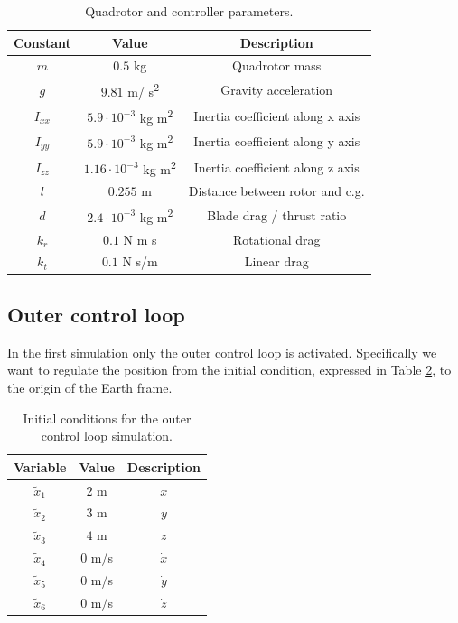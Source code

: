 \documentclass[11pt,a4paper]{scrartcl}
\begin{document}
\begin{table}[H]
	\centering
	\begin{tabular}{c c c}
		\toprule
		Constant & Value & Description \\
		\midrule 
		$m$  & $0.5$ kg & Quadrotor mass \\
		$g$  & $9.81$ m/ s\textsuperscript{2}  & Gravity acceleration \\
		$I_{xx}$  & $5.9\cdot 10^{-3}$ kg m\textsuperscript{2} & Inertia coefficient along x axis \\
		$I_{yy}$  & $5.9\cdot 10^{-3}$ kg m\textsuperscript{2} & Inertia coefficient along y axis \\
		$I_{zz}$  & $1.16\cdot 10^{-3}$ kg m\textsuperscript{2} & Inertia coefficient along z axis \\
		$l$  & $0.255$ m & Distance between rotor and c.g. \\
		$d$  & $2.4\cdot 10^{-3}$ kg m\textsuperscript{2} & Blade drag / thrust ratio \\
		$k_r$  & $0.1$ N m s & Rotational drag \\
		$k_t$  & $0.1$ N s/m & Linear drag \\
		\bottomrule
	\end{tabular}
	\caption{Quadrotor and controller parameters.}
	\label{Quadrotor and parameters}
\end{table}

\subsection*{Outer control loop}

In the first simulation only the outer control loop is activated. Specifically we want to regulate the position from the initial condition, expressed in Table \ref{InitCondOuter}, to the origin of the Earth frame.

\begin{table}[H]
	\centering
	\begin{tabular}{c c c}
		\toprule
		Variable & Value & Description \\
		\midrule 
		$\tilde{x}_1$  & $ 2 $ m & $x$ \\
		$\tilde{x}_2$  & $3$ m & $y$ \\
		$\tilde{x}_3$  & $4$ m & $z$ \\
		$\tilde{x}_4$  & $0$ m/s & $\dot{x}$ \\
		$\tilde{x}_5$  & $0$ m/s & $\dot{y}$ \\
		$\tilde{x}_6$  & $0$ m/s & $\dot{z}$ \\
		\bottomrule
	\end{tabular}
	\caption{Initial conditions for the outer control loop simulation.}
	\label{InitCondOuter}
\end{table}
\end{document}
